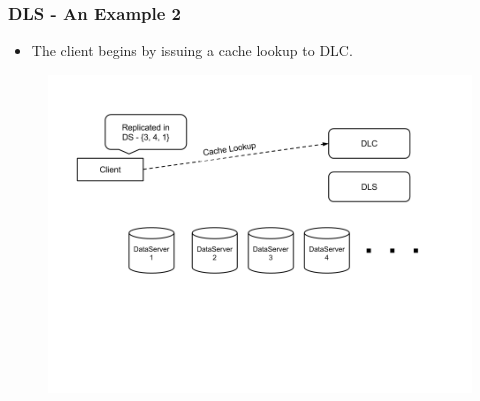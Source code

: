 \documentclass{beamer}
\begin{document}
\begin{frame}
  \frametitle{DLS - An Example 2}
  \begin{itemize}
  \item The client begins by issuing a cache lookup to DLC.
\newline
  \end{itemize}
  \begin{figure}
    \begin{center}
      \centerline{\includegraphics[scale=0.40]{img/DLS_Example3.png}}
    \end{center}
  \end{figure}


\end{frame}
\end{document}
